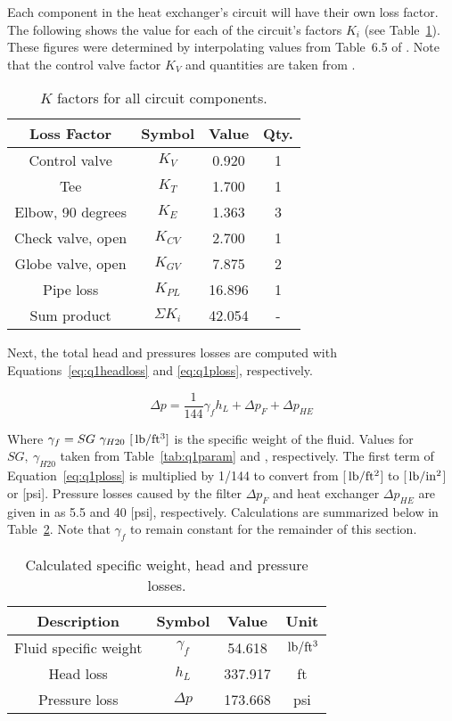 Each component in the heat exchanger's circuit will have their own loss factor. The following  shows the value for each of the circuit's factors $K_i$ (see Table~\ref{tab:kfact}). These figures were determined by interpolating values from Table~6.5 of \cite{fluids}. Note that the control valve factor $K_V$ and quantities are taken from \cite{assign}.

\begin{table}[H]
  \centering
  \caption{$K$ factors for all circuit components.}
    \begin{tabular}{cccc}
    \toprule
    \textbf{Loss Factor} & \textbf{Symbol} & \textbf{Value } & \textbf{Qty.} \\
    \midrule
    Control valve & $K_V$ & 0.920 & 1 \\
    Tee   & $K_T$ & 1.700 & 1 \\
    Elbow, 90 degrees & $K_E$ & 1.363 & 3 \\
    Check valve, open & $K_{CV}$ & 2.700 & 1 \\
    Globe valve, open & $K_{GV}$ & 7.875 & 2 \\
    Pipe loss & $K_{PL}$ & 16.896 & 1 \\
    Sum product  & $\Sigma K_i$   & 42.054 & - \\
    \bottomrule
    \end{tabular}
  \label{tab:kfact}
\end{table}

Next, the total head and pressures losses are computed with Equations~\ref{eq:q1headloss} and \ref{eq:q1ploss}, respectively. 

\begin{equation}
	\label{eq:q1ploss}	
	\Delta p = \frac{1}{144}\gamma_f h_L + \Delta p_F + \Delta p_{HE} 
\end{equation}

Where $\gamma_f = SG\  \gamma_{H20} \ [\Unit{lb/ft^3}]$ is the specific weight of the fluid. Values for  $SG,\ \gamma_{H20}$ taken from Table~\ref{tab:q1param} and \cite{fluids}, respectively. The first term of Equation~\ref{eq:q1ploss} is multiplied by 1/144 to convert from [$\,\mathrm{lb/ft^2}$] to [$\,\mathrm{lb/in^2}$] or [psi]. Pressure losses caused by the filter $\Delta p_F$ and heat exchanger $\Delta p_{HE}$ are given in \cite{assign} as 5.5 and 40 [psi], respectively. Calculations are summarized below in Table~\ref{tab:q1plossa}. Note that $\gamma_f$ to remain constant for the remainder of this section.

\begin{table}[H]
  \centering
  \caption{Calculated specific weight, head and pressure losses.}
    \begin{tabular}{cccc}
    \toprule
    \textbf{Description} & \textbf{Symbol} & \textbf{Value} & \textbf{Unit} \\
    \midrule
    Fluid specific weight & $\gamma_f$ & 54.618 & $\,\mathrm{lb/ft^3}$\\
    Head loss & $h_L$ & 337.917 & ft \\
    Pressure loss & $\Delta p$ & 173.668 & psi \\
    \bottomrule
    \end{tabular}
  \label{tab:q1plossa}
\end{table}

